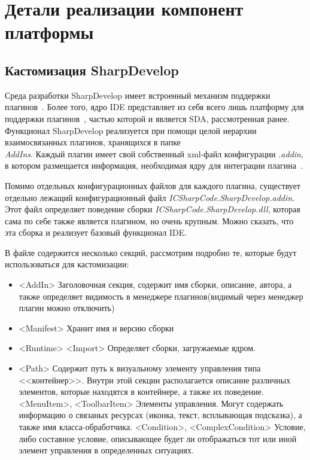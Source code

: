 \section{Детали реализации компонент платформы}
\label{sec:dev-details}

\subsection{Кастомизация SharpDevelop}
\label{sec:sd_custom}

Среда разработки SharpDevelop имеет встроенный механизм поддержки плагинов~\cite{sharpdevelop}. Более того, ядро IDE представляет из себя всего лишь платформу для поддержки плагинов~\cite{use-sd-core}, частью которой и является SDA, рассмотренная ранее. Функционал SharpDevelop реализуется при помощи целой иерархии взаимосвязанных плагинов, хранящихся в папке {\it \\AddIns}. Каждый плагин имеет свой собственный xml-файл конфигурации {\it *.addin}, в котором размещается информация, необходимая ядру для интеграции плагина~\cite{writing-sd-addin}. 

Помимо отдельных конфигурационных файлов для каждого плагина, существует отдельно лежащий конфигурационный файл {\it ICSharpCode.SharpDevelop.addin}. Этот файл определяет поведение сборки {\it ICSharpCode.SharpDevelop.dll}, которая сама по себе также является плагином, но очень крупным. Можно сказать, что эта сборка и реализует базовый функционал IDE.

В файле содержится несколько секций, рассмотрим подробно те, которые будут использоваться для кастомизации: 

\begin{itemize}
 \item <AddIn> Заголовочная секция, содержит имя сборки, описание, автора, а также определяет видимость в менеджере плагинов(видимый через менеджер плагин можно отключить)
 \item <Manifest> Хранит имя и версию сборки
 \item <Runtime> <Import> Определяет сборки, загружаемые ядром.
 \item <Path> Содержит путь к визуальному элементу управления типа <<контейнер>>. Внутри этой секции располагается описание различных элементов, которые находятся в контейнере, а также их поведение.
   \subitem <MenuItem>, <ToolbarItem> Элементы управления. Могут содержать информацию о связаных ресурсах (иконка, текст, всплывающая подсказка), а также имя класса-обработчика.
   \subitem <Condition>, <ComplexCondition> Условие, либо составное условие, описывающее будет ли отображаться тот или иной элемент управления в определенных ситуациях.
\end{itemize}

